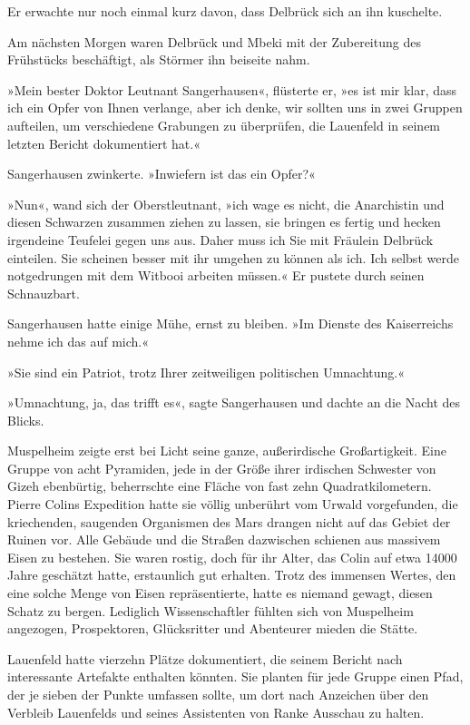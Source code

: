 Er erwachte nur noch einmal kurz davon, dass Delbrück sich an ihn
kuschelte.

\bigpar

Am nächsten Morgen waren Delbrück und Mbeki mit der Zubereitung des
Frühstücks beschäftigt, als Störmer ihn beiseite nahm.

»Mein bester Doktor Leutnant Sangerhausen«, flüsterte er, »es ist
mir klar, dass ich ein Opfer von Ihnen verlange, aber ich denke,
wir sollten uns in zwei Gruppen aufteilen, um verschiedene
Grabungen zu überprüfen, die Lauenfeld in seinem letzten Bericht
dokumentiert hat.«

Sangerhausen zwinkerte. »Inwiefern ist das ein Opfer?«

»Nun«, wand sich der Oberstleutnant, »ich wage es nicht, die
Anarchistin und diesen Schwarzen zusammen ziehen zu lassen, sie
bringen es fertig und hecken irgendeine Teufelei gegen uns aus.
Daher muss ich Sie mit Fräulein Delbrück einteilen. Sie scheinen
besser mit ihr umgehen zu können als ich. Ich selbst werde
notgedrungen mit dem Witbooi arbeiten müssen.« Er pustete durch
seinen Schnauzbart.

Sangerhausen hatte einige Mühe, ernst zu bleiben. »Im Dienste des
Kaiserreichs nehme ich das auf mich.«

»Sie sind ein Patriot, trotz Ihrer zeitweiligen politischen
Umnachtung.«

»Umnachtung, ja, das trifft es«, sagte Sangerhausen und dachte an
die Nacht des Blicks.

Muspelheim zeigte erst bei Licht seine ganze, außerirdische
Großartigkeit. Eine Gruppe von acht Pyramiden, jede in der Größe
ihrer irdischen Schwester von Gizeh ebenbürtig, beherrschte eine
Fläche von fast zehn Quadratkilometern. Pierre Colins Expedition
hatte sie völlig unberührt vom Urwald vorgefunden, die kriechenden,
saugenden Organismen des Mars drangen nicht auf das Gebiet der
Ruinen vor. Alle Gebäude und die Straßen dazwischen schienen aus
massivem Eisen zu bestehen. Sie waren rostig, doch für ihr Alter,
das Colin auf etwa 14000 Jahre geschätzt hatte, erstaunlich gut
erhalten. Trotz des immensen Wertes, den eine solche Menge von
Eisen repräsentierte, hatte es niemand gewagt, diesen Schatz zu
bergen. Lediglich Wissenschaftler fühlten sich von Muspelheim
angezogen, Prospektoren, Glücksritter und Abenteurer mieden die
Stätte.

Lauenfeld hatte vierzehn Plätze dokumentiert, die seinem Bericht
nach interessante Artefakte enthalten könnten. Sie planten für jede
Gruppe einen Pfad, der je sieben der Punkte umfassen sollte, um
dort nach Anzeichen über den Verbleib Lauenfelds und seines
Assistenten von Ranke Ausschau zu halten.

